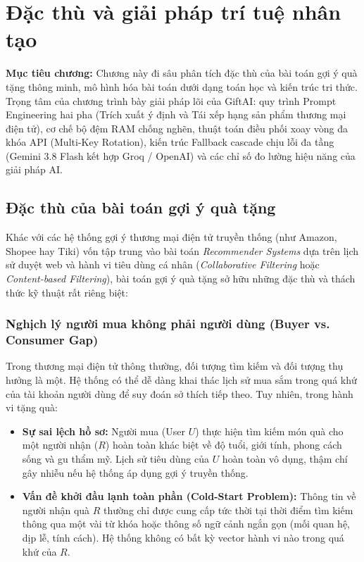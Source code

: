 
\chapter{Đặc thù và giải pháp trí tuệ nhân tạo}
\label{chap:chuong4}

\begin{infobox}
\textbf{Mục tiêu chương:}
Chương này đi sâu phân tích đặc thù của bài toán gợi ý quà tặng thông minh, mô hình hóa bài toán dưới dạng toán học và kiến trúc tri thức. Trọng tâm của chương trình bày giải pháp lõi của GiftAI: quy trình Prompt Engineering hai pha (Trích xuất ý định và Tái xếp hạng sản phẩm thương mại điện tử), cơ chế bộ đệm RAM chống nghẽn, thuật toán điều phối xoay vòng đa khóa API (Multi-Key Rotation), kiến trúc Fallback cascade chịu lỗi đa tầng (Gemini 3.8 Flash kết hợp Groq / OpenAI) và các chỉ số đo lường hiệu năng của giải pháp AI.
\end{infobox}

\section{Đặc thù của bài toán gợi ý quà tặng}

Khác với các hệ thống gợi ý thương mại điện tử truyền thống (như Amazon, Shopee hay Tiki) vốn tập trung vào bài toán \textit{Recommender Systems} dựa trên lịch sử duyệt web và hành vi tiêu dùng cá nhân (\textit{Collaborative Filtering} hoặc \textit{Content-based Filtering}), bài toán gợi ý quà tặng sở hữu những đặc thù và thách thức kỹ thuật rất riêng biệt:

\subsection{Nghịch lý người mua không phải người dùng (Buyer vs. Consumer Gap)}
Trong thương mại điện tử thông thường, đối tượng tìm kiếm và đối tượng thụ hưởng là một. Hệ thống có thể dễ dàng khai thác lịch sử mua sắm trong quá khứ của tài khoản người dùng để suy đoán sở thích tiếp theo. Tuy nhiên, trong hành vi tặng quà:
\begin{itemize}
    \item \textbf{Sự sai lệch hồ sơ:} Người mua (User $U$) thực hiện tìm kiếm món quà cho một người nhận ($R$) hoàn toàn khác biệt về độ tuổi, giới tính, phong cách sống và gu thẩm mỹ. Lịch sử tiêu dùng của $U$ hoàn toàn vô dụng, thậm chí gây nhiễu nếu hệ thống áp dụng gợi ý truyền thống.
    \item \textbf{Vấn đề khởi đầu lạnh toàn phần (Cold-Start Problem):} Thông tin về người nhận quà $R$ thường chỉ được cung cấp tức thời tại thời điểm tìm kiếm thông qua một vài từ khóa hoặc thông số ngữ cảnh ngắn gọn (mối quan hệ, dịp lễ, tính cách). Hệ thống không có bất kỳ vector hành vi nào trong quá khứ của $R$.
\end{itemize}

